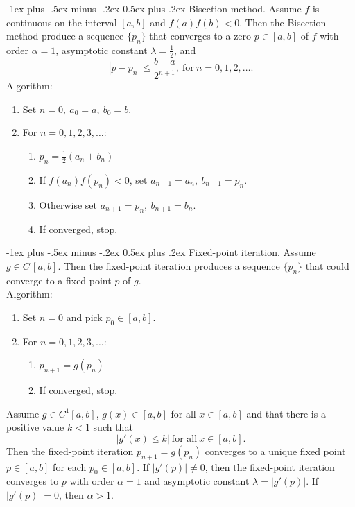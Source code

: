 \documentclass[10pt,landscape,a4paper]{article}
\makeatletter
\renewcommand{\section}{\@startsection{section}{1}{0mm}%
	{-1ex plus -.5ex minus -.2ex}%
	{0.5ex plus .2ex}%
	{\normalfont\large\bfseries}}
\makeatother
\begin{document}
\begin{multicols}{3}
		\section{Bisection method.}
		Assume $ f $ is continuous on the interval $ [a,b] $ and $ f(a)f(b)<0 $.
		Then the Bisection method produce a sequence $ \{p_n\} $ that converges to a zero $ p\in[a,b] $ of $ f $ with order $ \alpha=1 $, asymptotic constant $ \lambda=\frac{1}{2} $, and
		\[
			|p-p_n|\leq\frac{b-a}{2^{n+1}}, \ \text{for} \ n=0,1,2,\hdots.
		\]
		Algorithm:
			\begin{enumerate}
				\item Set $ n=0, \ a_0=a, \ b_0=b $.
				\item For $ n=0,1,2,3,\hdots $:
					\begin{enumerate}
						\item $ p_n=\frac{1}{2}(a_n+b_n) $
						\item If $ f(a_n)f(p_n)<0 $, set $ a_{n+1}=a_n, \ b_{n+1}=p_n $.
						\item Otherwise set $ a_{n+1}=p_n, \ b_{n+1}=b_n $.
						\item If converged, stop.
					\end{enumerate}
			\end{enumerate}
		
		\section{Fixed-point iteration.}
		Assume $ g\in C\,[a,b] $.
		Then the fixed-point iteration produces a sequence $ \{p_n\} $ that could converge to a fixed point $ p $ of $ g $.\\
		Algorithm:
			\begin{enumerate}
				\item Set $ n=0 $ and pick $ p_0\in[a,b] $.
				\item For $ n=0,1,2,3,\hdots $:
					\begin{enumerate}
						\item $ p_{n+1}=g(p_n) $
						\item If converged, stop.
					\end{enumerate}
			\end{enumerate}
		Assume $ g\in C^1[a,b] $, $ g(x)\in[a,b] $ for all $ x\in[a,b] $ and that there is a positive value $ k<1 $ such that
		\[
			|g'(x)\leq k| \ \text{for all} \ x\in[a,b].
		\]
		Then the fixed-point iteration $ p_{n+1}=g(p_n) $ converges to a unique fixed point $ p\in[a,b] $ for each $ p_0\in[a,b] $.
		If $ |g'(p)|\neq0 $, then the fixed-point iteration converges to $ p $ with order $ \alpha=1 $ and asymptotic constant $ \lambda=|g'(p)| $. If $ |g'(p)|=0 $, then $ \alpha>1 $.
		

\end{multicols}
\end{document}

